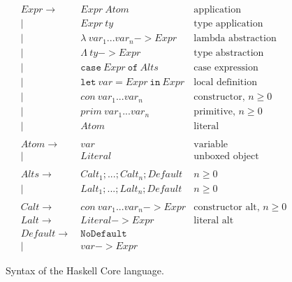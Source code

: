 \begin{figure}[h]
\begin{align*}
Expr \to~& Expr~Atom & \text{application}\\
|~& Expr~ty & \text{type application}\\
|~& \lambda~var_1 ... var_n \mathtt{{-}{>}} Expr & \text{lambda abstraction}\\
|~& \Lambda~ty \mathtt{{-}{>}} Expr & \text{type abstraction}\\
|~& \mathtt{case}~Expr~\mathtt{of}~Alts & \text{case expression}\\
|~& \mathtt{let}~var\mathtt{=}Expr~\mathtt{in}~Expr & \text{local definition}\\
|~& con~var_1 ... var_n & \text{constructor, $n \geq 0$}\\
|~& prim~var_1 ... var_n & \text{primitive, $n \geq 0$}\\
|~& Atom & \text{literal}\\
\\
Atom \to~& var & \text{variable}\\
|~& Literal & \text{unboxed object}\\
\\
Alts \to~& Calt_1; ...; Calt_n; Default & \text{$n \geq 0$}\\
|~& Lalt_1; ...; Lalt_n; Default & \text{$n \geq 0$}\\
\\
Calt \to~& con~var_1 ... var_n \mathtt{{-}{>}} Expr & \text{constructor alt, $n \geq 0$}\\
Lalt \to~& Literal \mathtt{{-}{>}} Expr & \text{literal alt}\\
Default \to~& \mathtt{NoDefault} & \text{}\\
|~& var \mathtt{{-}{>}} Expr & \text{}
\end{align*}
\caption{Syntax of the Haskell Core language.}
\label{fig:haskell_core}
\end{figure}

